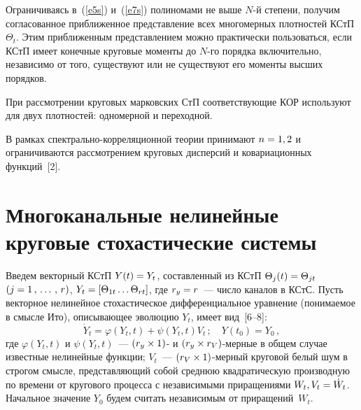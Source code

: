 \begin{multicols}{2}
Ограничиваясь в~(\ref{e5s}) и~(\ref{e7s}) полиномами  не выше $N$-й степени, 
получим согласованное приближенное представление всех многомерных плотностей КСтП $\Theta_t$. 
Этим приближенным представлением можно практически пользоваться, если КСтП 
имеет конечные круговые моменты до $N$-го порядка включительно, независимо от того, 
существуют или не существуют его моменты высших порядков.

При рассмотрении круговых марковских СтП соответствующие КОР 
используют для двух плотностей: одномерной и переходной.

В рамках спектрально-корреляционной теории принимают $n\hm=1,2$ и ограничиваются 
рассмотрением круговых дисперсий и ковариационных функций~[2].

\section{Многоканальные нелинейные круговые стохастические системы}

Введем векторный КСтП $Y(t) \hm= Y_t$, составленный из КСтП 
$\Theta_j(t) \hm=\Theta_{jt}$ $(j\hm=1\tr r)$, $Y_t \hm=\lk \Theta_{1t}\ldots \Theta_{rt}\rk$, 
где $r_y \hm=r$~--- число каналов в КСтС. 
Пусть векторное нелинейное стохастическое дифференциальное уравнение (понимаемое в смысле Ито), 
описывающее эволюцию $Y_t$, имеет вид~[6--8]:
\begin{equation}
\dot Y_t =\varphi (Y_t, t) +\psi (Y_t, t) V_t\,;\quad Y(t_0) = Y_0\,,\label{e9s}
\end{equation}
где $\varphi (Y_t, t)$ и $\psi (Y_t, t)$~--- $(r_y \hm\times 1)$- и $(r_y\hm\times r_V)$-мер\-ные в 
общем случае  известные нелинейные функции; $V_t$~--- $(r_V \hm\times 1)$-мер\-ный 
круговой белый шум в строгом смысле, представляющий собой среднюю квадратическую 
производную по времени от кругового процесса с независимыми приращениями $W_t, V_t \hm= \dot W_t$.
Начальное значение $Y_0$ будем считать независимым от приращений~$W_t$.


\end{multicols}
